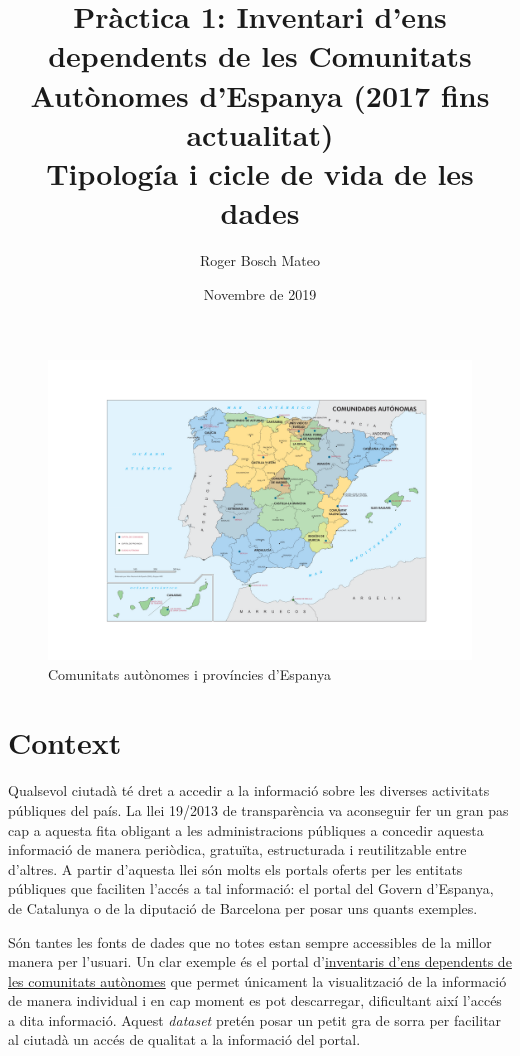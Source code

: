 \documentclass[12pt]{article}
\title{%
Pràctica 1: Inventari d'ens dependents de les Comunitats Autònomes d'Espanya (2017 fins actualitat)\\
\large Tipología i cicle de vida de les dades}
\author{Roger Bosch Mateo}
\date{Novembre de 2019}
\begin{document}
\maketitle

\begin{figure}[H]
    \centering
    \includegraphics[width=1\columnwidth]{img/mapa.pdf}
    \caption{Comunitats autònomes i províncies d'Espanya} 
    \label{flowchart}
\end{figure}

\section*{Context}
Qualsevol ciutadà té dret a accedir a la informació sobre les diverses activitats públiques del país. La llei 19/2013 de transparència va aconseguir fer un gran pas cap a aquesta fita obligant a les administracions públiques a concedir aquesta informació de manera periòdica, gratuïta, estructurada i reutilitzable entre d'altres. A partir d'aquesta llei són molts els portals oferts per les entitats públiques que faciliten l'accés a tal informació: el portal del Govern d'Espanya, de Catalunya o de la diputació de Barcelona per posar uns quants exemples.\par
Són tantes les fonts de dades que no totes estan sempre accessibles de la millor manera per l'usuari.
Un clar exemple és el portal d'\href{https://serviciostelematicosext.hacienda.gob.es/SGCIEF/PubInvCCAA/secciones/FrmSelComunidad.aspx}{inventaris d'ens dependents de les comunitats autònomes} que permet únicament la visualització de la informació de manera individual i en cap moment es pot descarregar, dificultant així l'accés a dita informació.
Aquest \textit{dataset} pretén posar un petit gra de sorra per facilitar al ciutadà un accés de qualitat a la informació del portal.
\end{document}
